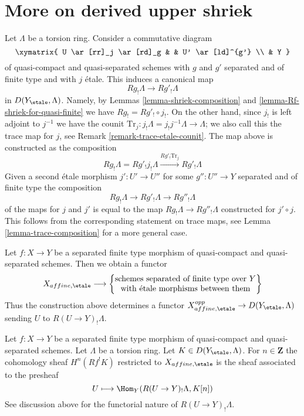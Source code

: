 \section{More on derived upper shriek}
\label{section-more-derived-upper-shriek}

\noindent
Let $\Lambda$ be a torsion ring. Consider a commutative diagram
$$
\xymatrix{
U \ar[rr]_j \ar[rd]_g & & U' \ar[ld]^{g'} \\
& Y
}
$$
of quasi-compact and quasi-separated schemes with $g$ and $g'$
separated and of finite type and with $j$ \'etale. This induces
a canonical map
$$
Rg_!\Lambda \longrightarrow Rg'_!\Lambda
$$
in $D(Y_\etale, \Lambda)$. Namely, by Lemmas \ref{lemma-shriek-composition}
and \ref{lemma-Rf-shriek-for-quasi-finite} we have $Rg_! = Rg'_! \circ j_!$.
On the other hand, since $j_!$ is left adjoint to $j^{-1}$ we have
the counit $\text{Tr}_j : j_!\Lambda = j_!j^{-1}\Lambda \to \Lambda$;
we also call this the trace map for $j$, see
Remark \ref{remark-trace-etale-counit}.
The map above is constructed as the composition
$$
Rg_!\Lambda = Rg'_!j_!\Lambda
\xrightarrow{Rg'_! \text{Tr}_j}
Rg'_!\Lambda
$$
Given a second \'etale morphism $j' : U' \to U''$
for some $g'' : U'' \to Y$ separated and of finite type
the composition
$$
Rg_!\Lambda \longrightarrow Rg'_!\Lambda \longrightarrow Rg''_!\Lambda
$$
of the maps for $j$ and $j'$ is equal to the map
$Rg_!\Lambda \longrightarrow Rg''_!\Lambda$ constructed for $j' \circ j$.
This follows from the corresponding statement on trace maps,
see Lemma \ref{lemma-trace-composition} for a more general case.

\medskip\noindent
Let $f : X \to Y$ be a separated finite type morphism of quasi-compact
and quasi-separated schemes. Then we obtain a functor
$$
X_{affine, \etale}
\longrightarrow
\left\{
\begin{matrix}
\text{schemes separated of finite type over }Y\\
\text{with \'etale morphisms between them}
\end{matrix}
\right\}
$$
Thus the construction above determines a functor
$X_{affine, \etale}^{opp} \to D(Y_\etale, \Lambda)$
sending $U$ to $R(U \to Y)_!\Lambda$.

\begin{lemma}
\label{lemma-describe-Rf-upper-shriek}
Let $f : X \to Y$ be a separated finite type morphism of quasi-compact
and quasi-separated schemes. Let $\Lambda$ be a torsion ring.
Let $K \in D(Y_\etale, \Lambda)$. For $n \in \mathbf{Z}$ the
cohomology sheaf $H^n(Rf^!K)$ restricted to $X_{affine, \etale}$
is the sheaf associated to the presheaf
$$
U \longmapsto \Hom_Y(R(U \to Y)_!\Lambda, K[n])
$$
See discussion above for the functorial nature of $R(U \to Y)_!\Lambda$.
\end{lemma}

